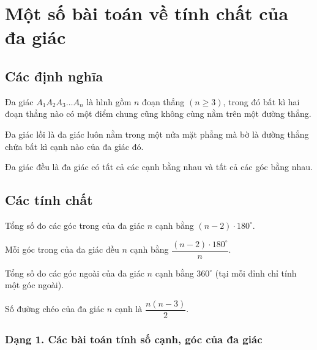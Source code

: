 \setcounter{bt}{0}
\section{Một số bài toán về tính chất của đa giác}
\begin{center}
\textbf{\color{violet}{Vũ Hữu Chín\\
(GV THCS Hồng Bàng, Hồng Bàng, Hải Phòng)}}
\end{center}

\subsection{Các định nghĩa}
\begin{dn}
Đa giác $A_1A_2A_3\ldots A_n$ là hình gồm $n$ đoạn thẳng $(n\geq3)$, trong đó bất kì hai đoạn thẳng nào có một điểm chung cũng không cùng nằm trên một đường thẳng.
\end{dn}
\begin{dn}
Đa giác lồi là đa giác luôn nằm trong một nửa mặt phẳng mà bờ là đường thẳng chứa bất kì cạnh nào của đa giác đó.
\end{dn}
\begin{dn}
Đa giác đều là đa giác có tất cả các cạnh bằng nhau và tất cả các góc bằng nhau.
\end{dn}
\subsection{Các tính chất}
\begin{tc}
Tổng số đo các góc trong của đa giác $n$ cạnh bằng $(n-2)\cdot 180^{\circ}$.
\end{tc}

\begin{tc}
Mỗi góc trong của đa giác đều $n$ cạnh bằng $\dfrac{(n-2)\cdot180^{\circ}}{n}$.
\end{tc}

\begin{tc}
Tổng số đo các góc ngoài của đa giác $n$ cạnh bằng $360^{\circ}$ (tại mỗi đỉnh chỉ tính một góc ngoài).
\end{tc}

\begin{tc}
Số đường chéo của đa giác $n$ cạnh là $\dfrac{n(n-3)}{2}$.
\end{tc}

\subsubsection{Dạng 1. Các bài toán tính số cạnh, góc của đa giác}

